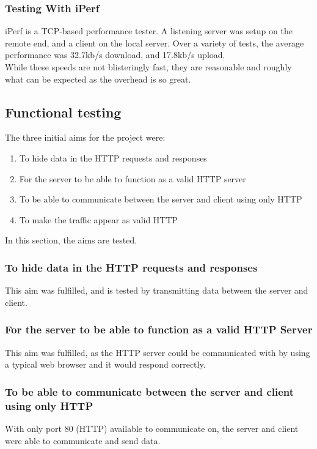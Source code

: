 \subsubsection*{Testing With iPerf}
iPerf is a TCP-based performance tester.
A listening server was setup on the remote end, and a client on the local server.
Over a variety of tests, the average performance was 32.7kb/s download, and 17.8kb/s upload.\\
While these speeds are not blisteringly fast, they are reasonable and roughly what can be expected as the overhead is so great.

\subsection{Functional testing}
The three initial aims for the project were:
\begin{enumerate}
    \item To hide data in the HTTP requests and responses
    \item For the server to be able to function as a valid HTTP server
    \item To be able to communicate between the server and client using only HTTP
    \item To make the traffic appear as valid HTTP
\end{enumerate}
In this section, the aims are tested.
\subsubsection*{To hide data in the HTTP requests and responses}
This aim was fulfilled, and is tested by transmitting data between the server and client.

\subsubsection*{For the server to be able to function as a valid HTTP Server}
This aim was fulfilled, as the HTTP server could be communicated with by using a typical web browser and it would respond correctly.

\subsubsection*{To be able to communicate between the server and client using only HTTP}
With only port 80 (HTTP) available to communicate on, the server and client were able to communicate and send data.

